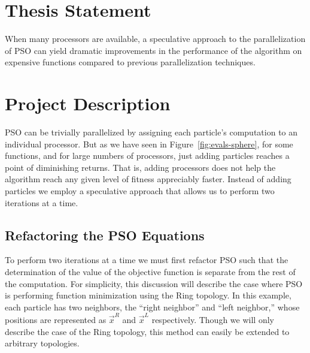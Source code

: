 \documentclass[ms]{byuprop}
\newcommand{\figref}[1]{Figure~\ref{fig:#1}}
\providecommand{\leftind}{\ensuremath{L}}
\providecommand{\rightind}{\ensuremath{R}}
\providecommand{\leftn}{\ensuremath{\Vec{x}^\leftind}}
\providecommand{\rightn}{\ensuremath{\Vec{x}^\rightind}}
\begin{document}

\section{Thesis Statement}

When many processors are available, a speculative approach to the
parallelization of PSO can yield dramatic improvements in the performance of
the algorithm on expensive functions compared to previous parallelization
techniques.


\section{Project Description}

PSO can be trivially parallelized by assigning each particle's computation to
an individual processor.  But as we have seen in \figref{evals-sphere}, for
some functions, and for large numbers of processors, just adding particles
reaches a point of diminishing returns.  That is, adding processors does not
help the algorithm reach any given level of fitness appreciably faster.
Instead of adding particles we employ a speculative approach that allows us to
perform two iterations at a time.

\subsection{Refactoring the PSO Equations}

To perform two iterations at a time we must first refactor PSO such that the
determination of the value of the objective function is separate from the rest
of the computation.  For simplicity, this discussion will describe the case
where PSO is performing function minimization using the Ring topology.  In this
example, each particle has two neighbors, the ``right neighbor'' and ``left
neighbor,'' whose positions are represented as $\rightn$ and $\leftn$
respectively.  Though we will only describe the case of the Ring topology, this
method can easily be extended to arbitrary topologies.
\end{document}
